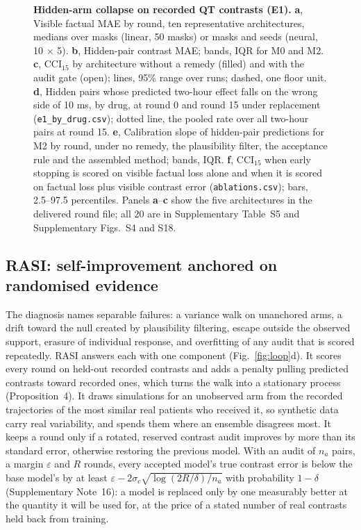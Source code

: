 \documentclass[11pt,a4paper]{article}
\newcommand{\CCI}{\mathrm{CCI}}
\begin{document}
\begin{figure}[!htbp]\centering
{}
\caption{\textbf{Hidden-arm collapse on recorded QT contrasts (E1).} \textbf{a}, Visible factual MAE by round, ten representative architectures, medians over masks (linear, 50 masks) or masks and seeds (neural, 10 $\times$ 5). \textbf{b}, Hidden-pair contrast MAE; bands, IQR for M0 and M2. \textbf{c}, $\CCI_{15}$ by architecture without a remedy (filled) and with the audit gate (open); lines, 95\% range over runs; dashed, one floor unit. \textbf{d}, Hidden pairs whose predicted two-hour effect falls on the wrong side of 10 ms, by drug, at round 0 and round 15 under replacement (\texttt{e1\_by\_drug.csv}); dotted line, the pooled rate over all two-hour pairs at round 15. \textbf{e}, Calibration slope of hidden-pair predictions for M2 by round, under no remedy, the plausibility filter, the acceptance rule and the assembled method; bands, IQR. \textbf{f}, $\CCI_{15}$ when early stopping is scored on visible factual loss alone and when it is scored on factual loss plus visible contrast error (\texttt{ablations.csv}); bars, 2.5--97.5 percentiles. Panels \textbf{a}--\textbf{c} show the five architectures in the delivered round file; all 20 are in Supplementary Table~S5 and Supplementary Figs.~S4 and S18. }\label{fig:collapse}
\end{figure}
\FloatBarrier
\subsection{RASI: self-improvement anchored on randomised evidence}
The diagnosis names separable failures: a variance walk on unanchored arms, a drift toward the null created by plausibility filtering, escape outside the observed support, erasure of individual response, and overfitting of any audit that is scored repeatedly. RASI answers each with one component (Fig.~\ref{fig:loop}d). It scores every round on held-out recorded contrasts and adds a penalty pulling predicted contrasts toward recorded ones, which turns the walk into a stationary process (Proposition~4). It draws simulations for an unobserved arm from the recorded trajectories of the most similar real patients who received it, so synthetic data carry real variability, and spends them where an ensemble disagrees most. It keeps a round only if a rotated, reserved contrast audit improves by more than its standard error, otherwise restoring the previous model. With an audit of $n_a$ pairs, a margin $\varepsilon$ and $R$ rounds, every accepted model's true contrast error is below the base model's by at least $\varepsilon-2\sigma_c\sqrt{\log(2R/\delta)/n_a}$ with probability $1-\delta$ (Supplementary Note~16): a model is replaced only by one measurably better at the quantity it will be used for, at the price of a stated number of real contrasts held back from training.
\end{document}
